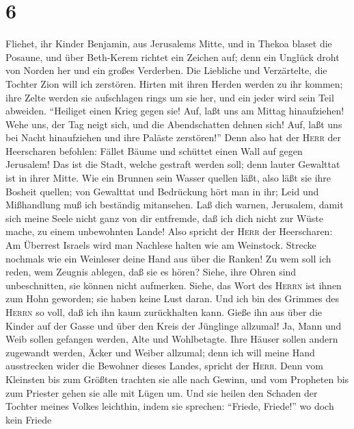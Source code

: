 \hypertarget{section-5}{%
\section{6}\label{section-5}}

 Fliehet, ihr Kinder Benjamin, aus Jerusalems Mitte, und
in Thekoa blaset die Posaune, und über Beth-Kerem richtet ein Zeichen
auf; denn ein Unglück droht von Norden her und ein großes Verderben.
 Die Liebliche und Verzärtelte, die Tochter Zion will ich
zerstören.  Hirten mit ihren Herden werden zu ihr kommen;
ihre Zelte werden sie aufschlagen rings um sie her, und ein jeder wird
sein Teil abweiden.  ``Heiliget einen Krieg gegen sie!
Auf, laßt uns am Mittag hinaufziehen! Wehe uns, der Tag neigt sich, und
die Abendschatten dehnen sich!  Auf, laßt uns bei Nacht
hinaufziehen und ihre Paläste zerstören!''  Denn also hat
der \textsc{Herr} der Heerscharen befohlen: Fället Bäume und schüttet
einen Wall auf gegen Jerusalem! Das ist die Stadt, welche gestraft
werden soll; denn lauter Gewalttat ist in ihrer Mitte. 
Wie ein Brunnen sein Wasser quellen läßt, also läßt sie ihre Bosheit
quellen; von Gewalttat und Bedrückung hört man in ihr; Leid und
Mißhandlung muß ich beständig mitansehen.  Laß dich
warnen, Jerusalem, damit sich meine Seele nicht ganz von dir entfremde,
daß ich dich nicht zur Wüste mache, zu einem unbewohnten Lande!
 Also spricht der \textsc{Herr} der Heerscharen: Am
Überrest Israels wird man Nachlese halten wie am Weinstock. Strecke
nochmals wie ein Weinleser deine Hand aus über die Ranken!
 Zu wem soll ich reden, wem Zeugnis ablegen, daß sie es
hören? Siehe, ihre Ohren sind unbeschnitten, sie können nicht aufmerken.
Siehe, das Wort des \textsc{Herrn} ist ihnen zum Hohn geworden; sie
haben keine Lust daran.  Und ich bin des Grimmes des
\textsc{Herrn} so voll, daß ich ihn kaum zurückhalten kann. Gieße ihn
aus über die Kinder auf der Gasse und über den Kreis der Jünglinge
allzumal! Ja, Mann und Weib sollen gefangen werden, Alte und
Wohlbetagte.  Ihre Häuser sollen andern zugewandt werden,
Äcker und Weiber allzumal; denn ich will meine Hand ausstrecken wider
die Bewohner dieses Landes, spricht der \textsc{Herr}. 
Denn vom Kleinsten bis zum Größten trachten sie alle nach Gewinn, und
vom Propheten bis zum Priester gehen sie alle mit Lügen um.
 Und sie heilen den Schaden der Tochter meines Volkes
leichthin, indem sie sprechen: ``Friede, Friede!'' wo doch kein Friede

